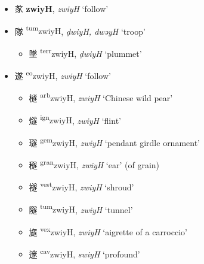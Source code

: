 \begin{itemize}
    \item {\Large{㒸}}  %
    {\large{\textbf{zwiyH}}},  
    \textit{zwiyH}       %
    `follow'

    \item {\Large{隊}}  %
    {\large{\textsuperscript{tum}zwiyH}},  
    \textit{ḍwiyH, dwəyH}       %
    `troop'
\begin{itemize}
    \item {\Large{墜}}  %
    {\large{\textsuperscript{terr}zwiyH}},  
    \textit{ḍwiyH}       %
    `plummet'
\end{itemize}

    \item {\Large{遂}}  %
    {\large{\textsuperscript{eo}zwiyH}},  
    \textit{zwiyH}       %
    `follow'
\begin{itemize}
    \item {\Large{檖}}  %
    {\large{\textsuperscript{arb}zwiyH}},  
    \textit{zwiyH}       %
    `Chinese wild pear'

    \item {\Large{燧}}  %
    {\large{\textsuperscript{ign}zwiyH}},  
    \textit{zwiyH}       %
    `flint'

    \item {\Large{璲}}  %
    {\large{\textsuperscript{gem}zwiyH}},  
    \textit{zwiyH}       %
    `pendant girdle ornament'

    \item {\Large{穟}}  %
    {\large{\textsuperscript{gran}zwiyH}},  
    \textit{zwiyH}       %
    `ear' (of grain)

    \item {\Large{襚}}  %
    {\large{\textsuperscript{vest}zwiyH}},  
    \textit{zwiyH}       %
    `shroud'

    \item {\Large{隧}}  %
    {\large{\textsuperscript{tum}zwiyH}},  
    \textit{zwiyH}       %
    `tunnel'

    \item {\Large{旞}}  %
    {\large{\textsuperscript{vex}zwiyH}},  
    \textit{zwiyH}       %
    `aigrette of a carroccio'

    \item {\Large{邃}}  %
    {\large{\textsuperscript{cav}zwiyH}},  
    \textit{swiyH}       %
    `profound'
\end{itemize}
\end{itemize}

